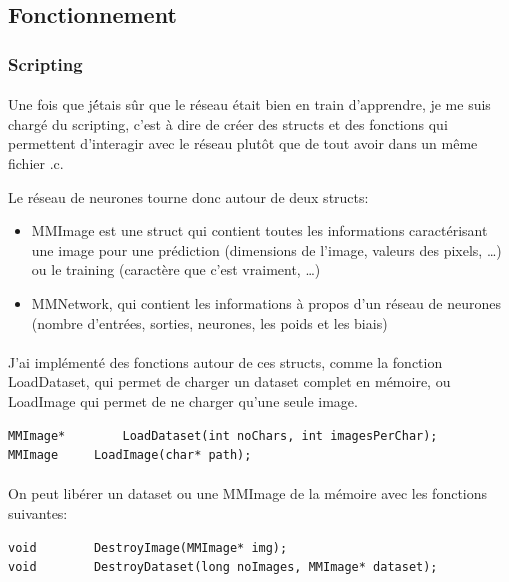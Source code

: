 \documentclass{article}
\begin{document}
\subsection{Fonctionnement}

\subsubsection{Scripting}
\paragraph{}Une fois que j\'étais sûr que le réseau était bien en train d'apprendre, je me suis chargé du scripting, c'est à dire de créer des structs et des fonctions qui permettent d'interagir avec le réseau plutôt que de tout avoir dans un même fichier .c.

Le réseau de neurones tourne donc autour de deux structs: 

\begin{itemize}
	\item MMImage est une struct qui contient toutes les informations caractérisant une image pour une prédiction (dimensions de l'image, valeurs des pixels, …) ou le training (caractère que c'est vraiment, …)
	\item MMNetwork, qui contient les informations à propos d'un réseau de neurones (nombre d'entrées, sorties, neurones, les poids et les biais)
\end{itemize}

\paragraph{}J'ai implémenté des fonctions autour de ces structs, comme la fonction LoadDataset, qui permet de charger un dataset complet en mémoire, ou LoadImage qui permet de ne charger qu'une seule image.

\begin{lstlisting}
MMImage*		LoadDataset(int noChars, int imagesPerChar);
MMImage		LoadImage(char* path);
\end{lstlisting}

\paragraph{}On peut libérer un dataset ou une MMImage de la mémoire avec les fonctions suivantes:
\begin{lstlisting}
void 		DestroyImage(MMImage* img);
void 		DestroyDataset(long noImages, MMImage* dataset);
\end{lstlisting}
\end{document}
